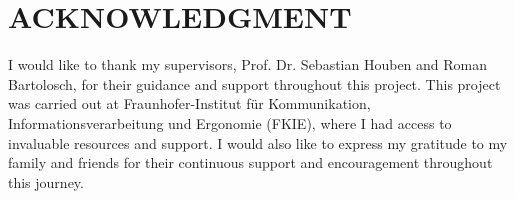 \documentclass[../report.tex]{subfiles}
\begin{document}
    \section*{ACKNOWLEDGMENT}

    I would like to thank my supervisors, Prof. Dr. Sebastian Houben and Roman Bartolosch, for their guidance and support throughout this project. 
    This project was carried out at Fraunhofer-Institut für Kommunikation, Informationsverarbeitung und Ergonomie (FKIE), where I had access to invaluable resources and support.
    I would also like to express my gratitude to my family and friends for their continuous support and encouragement throughout this journey.
\end{document}
